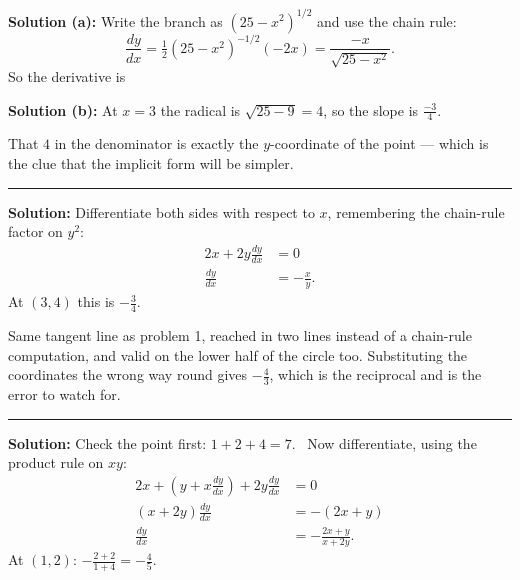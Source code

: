 \documentclass[12pt]{article}
\begin{document}



\textbf{Solution (a):} Write the branch as $\left(25 - x^2\right)^{1/2}$ and use
the chain rule:
\[
  \frac{dy}{dx} = \tfrac{1}{2}\left(25-x^2\right)^{-1/2}(-2x)
    = \frac{-x}{\sqrt{25-x^2}} .
\]
So the derivative is 

\textbf{Solution (b):} At $x = 3$ the radical is $\sqrt{25-9} = 4$, so the slope
is $\frac{-3}{4}$. 

That $4$ in the denominator is exactly the $y$-coordinate of the point --- which
is the clue that the implicit form will be simpler.

\vspace{0.15cm}\noindent\rule{\linewidth}{0.2pt}\vspace{0.15cm}


\textbf{Solution:} Differentiate both sides with respect to $x$, remembering the
chain-rule factor on $y^2$:
\begin{align*}
  2x + 2y\frac{dy}{dx} &= 0 \\
  \frac{dy}{dx} &= -\frac{x}{y} .
\end{align*}
At $(3,4)$ this is $-\frac{3}{4}$. 

Same tangent line as problem 1, reached in two lines instead of a chain-rule
computation, and valid on the lower half of the circle too. Substituting the
coordinates the wrong way round gives $-\frac{4}{3}$, which is the reciprocal
and is the error to watch for.

\vspace{0.15cm}\noindent\rule{\linewidth}{0.2pt}\vspace{0.15cm}


\textbf{Solution:} Check the point first: $1 + 2 + 4 = 7$. \ Now differentiate,
using the product rule on $xy$:
\begin{align*}
  2x + \left(y + x\frac{dy}{dx}\right) + 2y\frac{dy}{dx} &= 0 \\
  (x + 2y)\frac{dy}{dx} &= -(2x + y) \\
  \frac{dy}{dx} &= -\frac{2x+y}{x+2y} .
\end{align*}
At $(1,2)$: $-\frac{2+2}{1+4} = -\frac{4}{5}$. 
\end{document}
